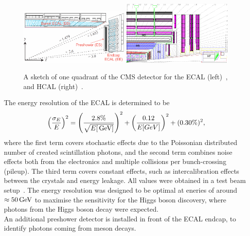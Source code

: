\begin{figure}[tbp]
 \centering
 \includegraphics[width=0.49\textwidth]{figures/general/ecal}
 \includegraphics[width=0.49\textwidth]{figures/general/hcal}
 \caption{A sketch of one quadrant of the CMS detector for the ECAL (left)~\cite{ECALPicture}, and HCAL (right)~\cite{CMS}.}
 \label{fig:etaPlaneCMS}
\end{figure}
The energy resolution of the ECAL is determined to be
\begin{equation}
 \left(\frac{\sigma_E}{E}\right)^2=\left(\frac{2.8\%}{\sqrt{E[\,\text{Ge\hspace{-.08em}V}]}}\right)^2 + \left(\frac{0.12}{E[GeV]}\right)^2 + (0.30\%)^2,
\end{equation}
where the first term covers stochastic effects due to the Poissonian distributed number of created scintillation photons, and the second term combines noise effects both from the electronics and multiple collisions per bunch-crossing (pileup). The third term covers constant effects, such as intercalibration effects between the crystals and energy leakage. All values were obtained in a test beam setup~\cite{ECALRes}. The energy resolution was designed to be optimal at eneries of around $\approx50\,\text{Ge\hspace{-.08em}V}$ to maximise the sensitivity for the Higgs boson discovery, where photons from the Higgs boson decay were expected.\\
An additional preshower detector is installed in front of the ECAL endcap, to identify photons coming from meson decays.

